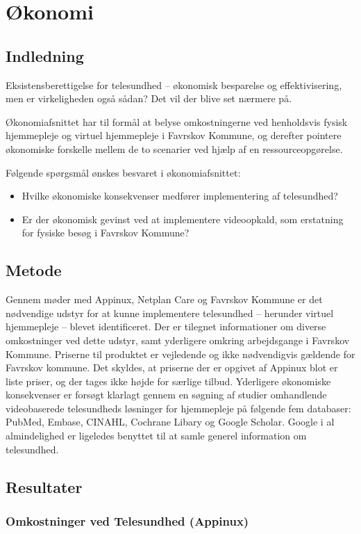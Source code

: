 \chapter{Økonomi}
\section{Indledning}
Eksistensberettigelse for telesundhed – økonomisk besparelse og effektivisering, men er virkeligheden også sådan? Det vil der blive set nærmere på.

Økonomiafsnittet har til formål at belyse omkostningerne ved henholdsvis fysisk hjemmepleje og virtuel hjemmepleje i Favrskov Kommune, og derefter pointere økonomiske forskelle mellem de to scenarier ved hjælp af en ressourceopgørelse.

Følgende spørgsmål ønskes besvaret i økonomiafsnittet:
\begin{itemize}
	\item Hvilke økonomiske konsekvenser medfører implementering af telesundhed?
	\item Er der økonomisk gevinst ved at implementere videoopkald, som erstatning for fysiske besøg i Favrskov Kommune?
\end{itemize}

\section{Metode}
Gennem møder med Appinux, Netplan Care og Favrskov Kommune er det nødvendige udstyr for at kunne implementere telesundhed – herunder virtuel hjemmepleje – blevet identificeret. 
Der er tilegnet informationer om diverse omkostninger ved dette udstyr, samt yderligere omkring arbejdsgange i Favrskov Kommune. 
Priserne til produktet er vejledende og ikke nødvendigvis gældende for Favrskov kommune. Det skyldes, at priserne der er opgivet af Appinux blot er liste priser, og der tages ikke højde for særlige tilbud. 
Yderligere økonomiske konsekvenser er forsøgt klarlagt gennem en søgning af studier omhandlende videobaserede telesundheds løsninger for hjemmepleje på følgende fem databaser: PubMed, Embase, CINAHL, Cochrane Libary og Google Scholar. Google i al almindelighed er ligeledes benyttet til at samle generel information om telesundhed. 

\section{Resultater}
\subsection{Omkostninger ved Telesundhed (Appinux)}
